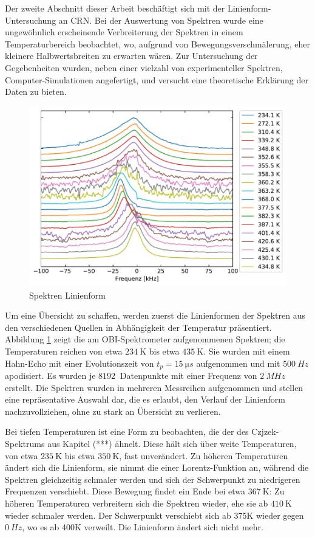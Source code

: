 Der zweite Abschnitt dieser Arbeit beschäftigt sich mit der Linienform-Untersuchung an CRN. Bei der Auswertung von Spektren wurde eine ungewöhnlich erscheinende Verbreiterung der Spektren in einem Temperaturbereich beobachtet, wo, aufgrund von Bewegungsverschmälerung, eher kleinere Halbwertsbreiten zu erwarten wären. Zur Untersuchung der Gegebenheiten wurden, neben einer vielzahl von experimenteller Spektren, Computer-Simulationen angefertigt, und versucht eine theoretische Erklärung der Daten zu bieten.

\begin{figure}
	\begin{center}
		\includegraphics[width=\textwidth]{graphics/plot/spek_lineshape.pdf}
	\end{center}
	\caption{Spektren Linienform} \label{fig:res:spek_linienform}
\end{figure}
Um eine Übersicht zu schaffen, werden zuerst die Linienformen der Spektren aus den verschiedenen Quellen in Abhängigkeit der Temperatur präsentiert. Abbildung \ref{fig:res:spek_linienform} zeigt die am OBI-Spektrometer aufgenommenen Spektren; die Temperaturen reichen von etwa $\SI{234}{\kelvin}$ bis etwa $\SI{435}{\kelvin}$. Sie wurden mit einem Hahn-Echo mit einer Evolutionszeit von $t_p = \SI{15}{\micro s}$ aufgenommen und mit $\SI{500}{Hz}$ apodisiert. Es wurden je $\SI{8192}{}$ Datenpunkte mit einer Frequenz von $\SI{2}{MHz}$ erstellt. Die Spektren wurden in mehreren Messreihen aufgenommen und stellen eine repräsentative Auswahl dar, die es erlaubt, den Verlauf der Linienform nachzuvollziehen, ohne zu stark an Übersicht zu verlieren.

Bei tiefen Temperaturen ist eine Form zu beobachten, die der des Czjzek-Spektrums aus Kapitel (***) ähnelt. Diese hält sich über weite Temperaturen, von etwa $\SI{235}{\kelvin}$ bis etwa $\SI{350}{\kelvin}$, fast unverändert. Zu höheren Temperaturen ändert sich die Linienform, sie nimmt die einer Lorentz-Funktion an, während die Spektren gleichzeitig schmaler werden und sich der Schwerpunkt zu niedrigeren Frequenzen verschiebt. Diese Bewegung findet ein Ende bei etwa $\SI{367}{\kelvin}$: Zu höheren Temperaturen verbreitern sich die Spektren wieder, ehe sie ab $\SI{410}{\kelvin}$ wieder schmaler werden. Der Schwerpunkt verschiebt sich ab 375K wieder gegen $\SI{0}{Hz}$, wo es ab 400K verweilt. Die Linienform ändert sich nicht mehr.

